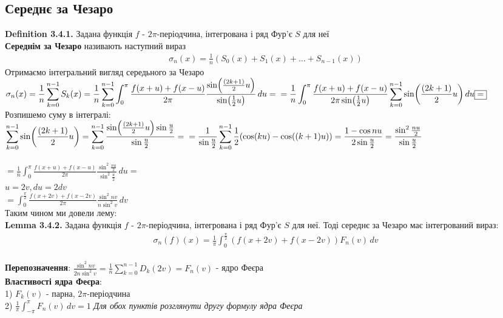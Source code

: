 \documentclass[a4paper, 14pt]{extarticle}
\def\hugespace{\vspace{5mm} \\}
\begin{document}
\subsection{Середнє за Чезаро}
\textbf{Definition 3.4.1.} Задана функція $f$ - $2\pi$-періодчина, інтегрована і ряд Фур'є $S$ для неї\\
\textbf{Середнім за Чезаро} називають наступний вираз
\begin{align*}
\sigma_n(x) = \frac{1}{n} \left( S_0(x) + S_1(x) + \dots + S_{n-1}(x) \right)
\end{align*}
Отримаємо інтегральний вигляд середьного за Чезаро\\
$\displaystyle \sigma_n(x) = \frac{1}{n} \sum_{k=0}^{n-1}S_k(x) = \frac{1}{n} \sum_{k=0}^{n-1} \int_{0}^{\pi} \frac{f(x+u) + f(x-u)}{2\pi} \frac{\sin (\frac{(2k+1)}{2}u)}{\sin (\frac{1}{2}u)} \,du =\\
= \frac{1}{n} \int_0^{\pi} \frac{f(x+u) + f(x-u)}{2\pi \sin (\frac{1}{2}u)}\sum_{k=0}^{n-1}  \sin (\frac{(2k+1)}{2}u) \,du \boxed{=}
$\\
Розпишемо суму в інтегралі:\\
$\displaystyle \sum_{k=0}^{n-1}  \sin (\frac{(2k+1)}{2}u) = \sum_{k=0}^{n-1} \frac{\sin (\frac{(2k+1)}{2}u) \sin \frac{u}{2}}{\sin \frac{u}{2}} = \\ = \frac{1}{\sin \frac{u}{2}}\sum_{k=0}^{n-1} \frac{1}{2} (\cos(ku)-\cos((k+1)u)) = \frac{1-\cos nu}{2\sin \frac{u}{2}} = \frac{\sin^2 \frac{nu}{2}}{\sin \frac{u}{2}}$\\
\\
$\displaystyle \boxed{=} \frac{1}{n} \int_0^{\pi} \frac{f(x+u) + f(x-u)}{2\pi} \frac{\sin^2 \frac{nu}{2}}{\sin^2 \frac{u}{2}} \,du = $\\
$u = 2v, du = 2dv$\\
$\displaystyle = \int_0^{\frac{\pi}{2}} \frac{f(x+2v) + f(x-2v)}{2\pi} \frac{\sin^2 nv}{n \sin^2 v} \,dv$\\
Таким чином ми довели лему:
\hugespace
\textbf{Lemma 3.4.2.} Задана функція $f$ - $2\pi$-періодчина, інтегрована і ряд Фур'є $S$ для неї. Тоді середнє за Чезаро має інтегрований вираз:
\begin{align*}
\sigma_n(f)(x) = \frac{1}{\pi}\int_0^{\frac{\pi}{2}} (f(x+2v) + f(x-2v)) F_n(v) \,dv
\end{align*}
\hugespace
\textbf{Перепозначення}: $\displaystyle \frac{\sin^2 nv}{2n \sin^2 v} = \frac{1}{n} \sum_{k=0}^{n-1} D_k(2v) = F_n(v)$ - ядро Феєра
\hugespace
\textbf{Властивості ядра Феєра}:\\
1) $F_k(v)$ - парна, $2\pi$-періодчина\\
2) $\displaystyle \frac{1}{\pi}\int_{-\pi}^{\pi}F_n(v)\,dv = 1$
\textit{Для обох пунктів розглянути другу формулу ядра Феєра}
\hugespace
\end{document}
